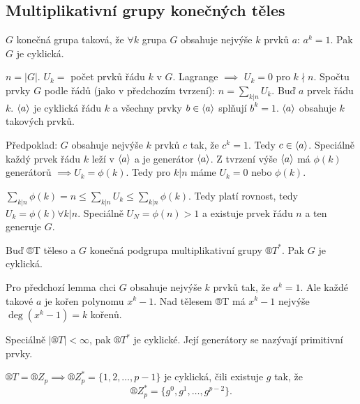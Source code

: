 \documentclass[12pt]{article}                   %
\begin{document}
    \subsection{Multiplikativní grupy konečných těles}
        \begin{lemma}
            $G$ konečná grupa taková, že $\forall k$ grupa $G$ obsahuje nejvýše $k$ prvků $a$: $a^k = 1$. Pak $G$ je cyklická.

            \begin{dukazin}
                $n = |G|$. $U_k =$ počet prvků řádu $k$ v $G$. Lagrange $\implies$ $U_k = 0$ pro $k \nmid n$. Spočtu prvky $G$ podle řádů (jako v předchozím tvrzení): $n = \sum_{k|n} U_k$. Buď $a$ prvek řádu $k$. $\left\langle a\right\rangle$ je cyklická řádu $k$ a všechny prvky $b \in \left\langle a\right\rangle$ splňují $b^k = 1$. $\left\langle a\right\rangle$ obsahuje $k$ takových prvků.

                Předpoklad: $G$ obsahuje nejvýše $k$ prvků $c$ tak, že $c^k = 1$. Tedy $c \in \left\langle a\right\rangle$. Speciálně každý prvek řádu $k$ leží v $\left\langle a\right\rangle$ a je generátor $\left\langle a\right\rangle$. Z tvrzení výše $\left\langle a\right\rangle$ má $\phi(k)$ generátorů $\implies U_k = \phi(k)$. Tedy pro $k|n$ máme $U_k = 0$ nebo $\phi(k)$.

                $\sum_{k|n} \phi(k) = n ≤ \sum_{k|n} U_k ≤ \sum_{k|n} \phi(k)$. Tedy platí rovnost, tedy $U_k = \phi(k) \forall k | n$. Speciálně $U_N = \phi(n) > 1$ a existuje prvek řádu $n$ a ten generuje $G$.
            \end{dukazin}
        \end{lemma}

        \begin{veta}
            Buď ®T těleso a $G$ konečná podgrupa multiplikativní grupy $®T^*$. Pak $G$ je cyklická.

            \begin{dukazin}
                Pro předchozí lemma chci $G$ obsahuje nejvýše $k$ prvků tak, že $a^k = 1$. Ale každé takové $a$ je kořen polynomu $x^k - 1$. Nad tělesem ®T má $x^k - 1$ nejvýše $\deg(x^k - 1) = k$ kořenů.
            \end{dukazin}
        \end{veta}

        \begin{dusledek}
            Speciálně $|®T| < ∞$, pak $®T^*$ je cyklické. Její generátory se nazývají primitivní prvky.

            $®T = ®Z_p \implies ®Z_p^* = \{1, 2, …, p-1\}$ je cyklická, čili existuje $g$ tak, že
            $$ ®Z_p^* = \{g^0, g^1, …, g^{p-2}\}. $$
        \end{dusledek}
\end{document}
